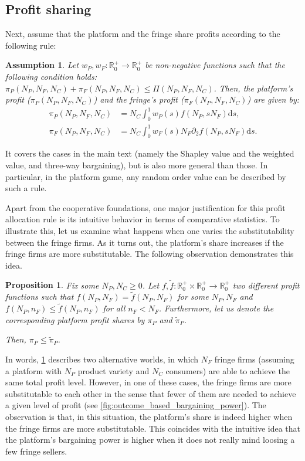 \documentclass[a4paper]{article}
\newtheorem{proposition}{Proposition}
\newtheorem{assumption}{Assumption}
\newcommand{\ds}{\mathrm{d}s}
\begin{document}
\subsection{Profit sharing}
\label{sec:more_general_profit_sharing}
Next, assume that the platform and the fringe share profits according to the following rule:
\begin{assumption}
    \label{ass:profit_sharing}
    Let $w_P, w_F: \mathbb{R}^+_0 \to \mathbb{R}^+_0$ be non-negative functions such that the following condition holds: $\pi_P(N_P, N_F, N_C) + \pi_F(N_P, N_F, N_C) \leq \Pi(N_P, N_F, N_C)$.
    Then, the platform's profit ($\pi_P(N_P, N_F, N_C)$) and the fringe's profit ($\pi_F(N_P, N_F, N_C)$) are given by:
    \begin{align*}
        \pi_P(N_P, N_F, N_C) &= N_C \int_0^1 w_P(s) f(N_P, s N_F) \ds, \\
        \pi_F(N_P, N_F, N_C) &= N_C \int_0^1 w_F(s) N_F \partial_2 f(N_P, s N_F) \ds.
    \end{align*}
\end{assumption}
It covers the cases in the main text (namely the Shapley value and the weighted value, and three-way bargaining), but is also more general than those.
In particular, in the platform game, any random order value \parencite{weber1988probabilistic} can be described by such a rule.

Apart from the cooperative foundations, one major justification for this profit allocation rule is its intuitive behavior in terms of comparative statistics.
To illustrate this, let us examine what happens when one varies the substitutability between the fringe firms.
As it turns out, the platform's share increases if the fringe firms are more substitutable.
The following observation demonstrates this idea.
\begin{proposition}
    \label{prop:outcome_based_bargaining_power}
    Fix some $N_P, N_C \geq 0$. Let $f, \tilde{f}: \mathbb{R}^+_0 \times \mathbb{R}^+_0 \to \mathbb{R}^+_0$ two different profit functions such that $f(N_P, N_F) = \tilde{f}(N_P, N_F)$ for some $N_P, N_F$ and $f(N_P, n_F) \leq \tilde{f}(N_P, n_F)$ for all $n_F < N_F$.
    Furthermore, let us denote the corresponding platform profit shares by $\pi_P$ and $\tilde{\pi}_P$.
    
    Then, $\pi_P \leq \tilde{\pi}_P$.
\end{proposition}

In words, \cref{prop:outcome_based_bargaining_power} describes two alternative worlds, in which $N_F$ fringe firms (assuming a platform with $N_P$ product variety and $N_C$ consumers) are able to achieve the same total profit level.
However, in one of these cases, the fringe firms are more substitutable to each other in the sense that fewer of them are needed to achieve a given level of profit (see \cref{fig:outcome_based_bargaining_power}).
The observation is that, in this situation, the platform's share is indeed higher when the fringe firms are more substitutable.
This coincides with the intuitive idea that the platform's bargaining power is higher when it does not really mind loosing a few fringe sellers.
\end{document}
